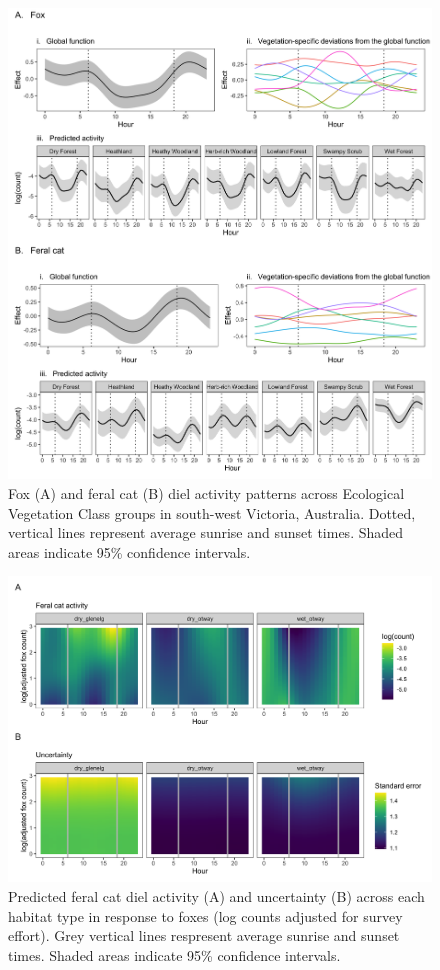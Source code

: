\documentclass[]{elsarticle} %
\begin{document}
\newpage

\begin{figure}
\includegraphics[width=1\linewidth]{../figs/predator_veg} \caption{Fox (A) and feral cat (B) diel activity patterns across Ecological Vegetation Class groups in south-west Victoria, Australia. Dotted, vertical lines represent average sunrise and sunset times. Shaded areas indicate 95\% confidence intervals.}\label{fig:veg}
\end{figure}

\newpage

\begin{figure}
\includegraphics[width=1\linewidth]{../figs/cat_fox_count} \caption{Predicted feral cat diel activity (A) and uncertainty (B) across each habitat type in response to foxes (log counts adjusted for survey effort). Grey vertical lines respresent average sunrise and sunset times. Shaded areas indicate 95\% confidence intervals.}\label{fig:count}
\end{figure}
\end{document}
